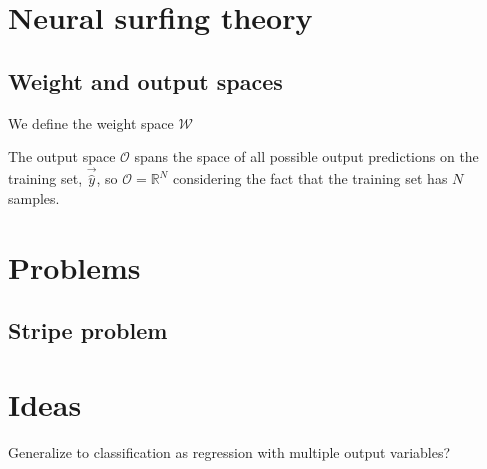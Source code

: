 \chapter{Neural surfing theory}
\section{Weight and output spaces}
We define the weight space $\mathcal{W}$ \todo

The output space $\mathcal{O}$ spans the space of all possible output predictions on the training set, $\vec{\hat{y}}$, so $\mathcal{O}=\mathbb{R}^N$ considering the fact that the training set has $N$ samples.

\chapter{Problems}
\section{Stripe problem}


\chapter*{Ideas}
Generalize to classification as regression with multiple output variables?
